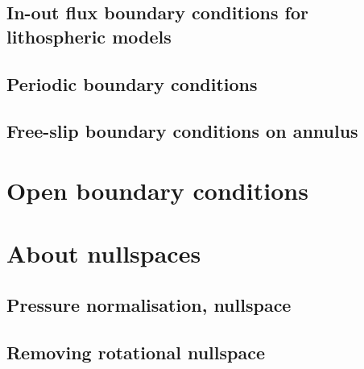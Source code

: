 \subsection{In-out flux boundary conditions for lithospheric models}\label{kin_bc}  
\newpage %
\subsection{Periodic boundary conditions\label{ss_periodic}} %
\newpage %
\subsection{Free-slip boundary conditions on annulus}\label{ss:fsbc_annulus} %

\newpage %
\section{Open boundary conditions}\label{ss:openbc} %

\newpage %
\section{About nullspaces} 
\subsection{Pressure normalisation, nullspace\label{ss_pnorm}}  %
\subsection{Removing rotational nullspace\label{ss_nullspace}}  %

